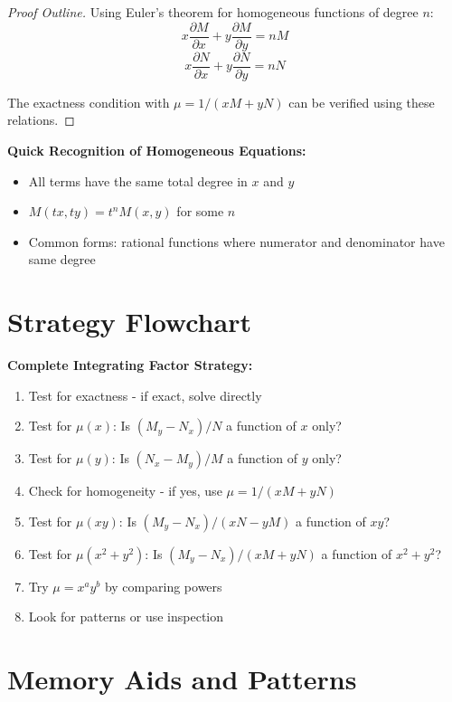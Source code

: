 \documentclass[12pt]{article}
\begin{document}
\begin{proof}[Proof Outline]
Using Euler's theorem for homogeneous functions of degree $n$:
\[x\frac{\partial M}{\partial x} + y\frac{\partial M}{\partial y} = nM\]
\[x\frac{\partial N}{\partial x} + y\frac{\partial N}{\partial y} = nN\]

The exactness condition with $\mu = 1/(xM + yN)$ can be verified using these relations.
\end{proof}

\begin{keypoint}
\textbf{Quick Recognition of Homogeneous Equations:}
\begin{itemize}
    \item All terms have the same total degree in $x$ and $y$
    \item $M(tx, ty) = t^n M(x,y)$ for some $n$
    \item Common forms: rational functions where numerator and denominator have same degree
\end{itemize}
\end{keypoint}

\section{Strategy Flowchart}

\begin{algorithm}
\textbf{Complete Integrating Factor Strategy:}
\begin{enumerate}
    \item Test for exactness - if exact, solve directly
    \item Test for $\mu(x)$: Is $(M_y - N_x)/N$ a function of $x$ only?
    \item Test for $\mu(y)$: Is $(N_x - M_y)/M$ a function of $y$ only?
    \item Check for homogeneity - if yes, use $\mu = 1/(xM + yN)$
    \item Test for $\mu(xy)$: Is $(M_y - N_x)/(xN - yM)$ a function of $xy$?
    \item Test for $\mu(x^2+y^2)$: Is $(M_y - N_x)/(xM + yN)$ a function of $x^2+y^2$?
    \item Try $\mu = x^a y^b$ by comparing powers
    \item Look for patterns or use inspection
\end{enumerate}
\end{algorithm}

\section{Memory Aids and Patterns}
\end{document}
